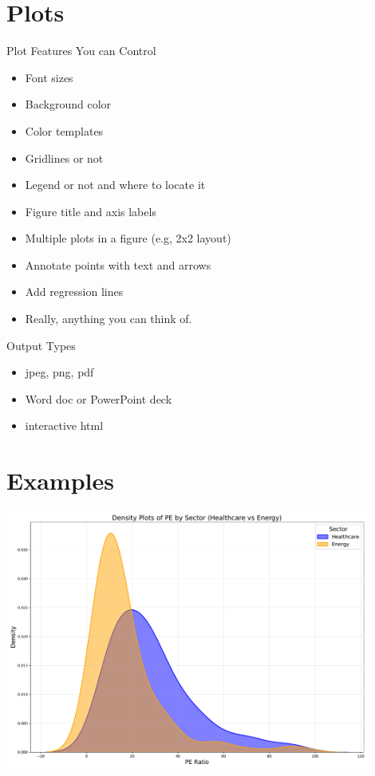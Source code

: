 \documentclass[10pt]{beamer}
\begin{document}
\section{Plots}

\begin{frame}{Plot Features You can Control}
  \begin{itemize}
    \item Font sizes
    \item Background color
    \item Color templates
    \item Gridlines or not 
    \item Legend or not and where to locate it
    \item Figure title and axis labels
    \item Multiple plots in a figure (e.g, 2x2 layout)
    \item Annotate points with text and arrows
    \item Add regression lines
    \item Really, anything you can think of.
  \end{itemize}
\end{frame}

\begin{frame}{Output Types}
\begin{itemize}
\item jpeg, png, pdf
\item Word doc or PowerPoint deck
\item interactive html
\end{itemize}
\end{frame}

\section{Examples}



\begin{frame}[plain]
  \begin{center}
  \includegraphics[width=0.9\textwidth]{financial_images/density_plot_pe_updated.pdf}
  \end{center}
\end{frame}
\end{document}
